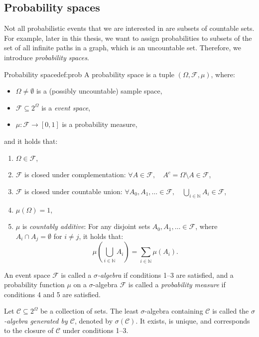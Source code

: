 \subsection{Probability spaces}
Not all probabilistic events that we are interested in are subsets of countable sets. For example, later in this thesis, we want to assign probabilities to subsets of the set of all infinite paths in a graph, which is an uncountable set. Therefore, we introduce \textit{probability spaces}.
\begin{mydefinition}{Probability space}{def:prob}
A probability space is a tuple $(\Omega, \mathcal{F}, \mu)$, where:
\begin{itemize}
    \item $\Omega \neq \emptyset$ is a (possibly uncountable) sample space,
    \item $\mathcal{F} \subseteq 2^\Omega$ is a \textit{event space}, 
    \item $\mu: \mathcal{F} \to [0, 1]$ is a probability measure,
\end{itemize}
and it holds that:
\begin{enumerate}
    \item $\Omega \in \mathcal{F}$,
    \item $\mathcal{F}$ is closed under complementation: $\forall A \in \mathcal{F},\quad A^c = \Omega \setminus A \in \mathcal{F}$, 
    \item $\mathcal{F}$ is closed under countable union: $\forall A_0, A_1, \dots \in \mathcal{F}, \quad \bigcup_{i \in \mathbb{N}} A_i \in \mathcal{F}$,
    \item $\mu(\Omega) = 1$,
    \item $\mu$ is \textit{countably additive}: For any disjoint sets $A_0, A_1, \dots \in \mathcal{F}$, where $A_i \cap A_j = \emptyset$ for $i \neq j$, it holds that:
    \[
    \mu\left(\bigcup_{i \in \mathbb{N}} A_i\right) = \sum_{i \in \mathbb{N}} \mu(A_i).
    \]
\end{enumerate}
An event space $\mathcal{F}$ is called a \textit{$\sigma$-algebra} if conditions 1–3 are satisfied, and a probability function $\mu$ on a $\sigma$-algebra $\mathcal{F}$ is called a \textit{probability measure} if conditions 4 and 5 are satisfied.

Let $\mathcal{C} \subseteq 2^\Omega$ be a collection of sets. The least $\sigma$-algebra containing $\mathcal{C}$ is called the \textit{$\sigma$-algebra generated by $\mathcal{C}$}, denoted by $\sigma(\mathcal{C})$. It exists, is unique, and corresponds to the closure of $\mathcal{C}$ under conditions 1–3. 
\end{mydefinition}



